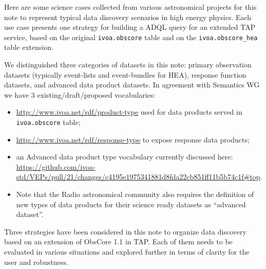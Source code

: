Here are some science cases collected from various astronomical projects for this note to represent typical data discovery scenarios in high energy physics.
Each use case presents one strategy for building a ADQL query for an  extended TAP service, based on the original {\tt ivoa.obscore} table and on the {\tt ivoa.obscore_hea} table extension.

We distinguished three categories of datasets in this note:
primary observation datasets (typically event-lists and event-bundles for \gls{HEA}), response function datasets, and advanced data product datasets.
In agreement with Semantics WG we have 3 existing/draft/proposed vocabularies:
\begin{itemize}
\item \url{http://www.ivoa.net/rdf/product-type} used for data products served in {\tt ivoa.obscore} table;
\item \url{http://www.ivoa.net/rdf/response-type} to expose response data products;
\item an Advanced data product type vocabulary currently  discussed here: \\
{\small \url{https://github.com/ivoa-std/VEPs/pull/21/changes/c4195e1975341881d8fda22cb851ff11b5b74c1f#top}}.\\
\vspace{-20pt}
\item[] Note that the Radio astronomical community also requires the definition of new types of data products for their science ready datasets as ``advanced dataset''.
\end{itemize}

Three strategies have been considered in this note to organize data discovery based on an extension of  ObsCore 1.1 in TAP\null. Each of them needs to be evaluated in various situations and explored further in terms of clarity for the user and robustness.

